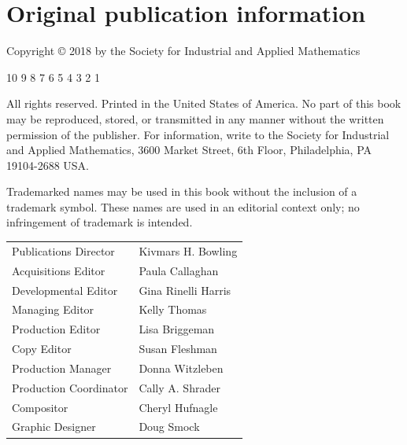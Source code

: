 \section*{{Original publication information}}
{Copyright © 2018 by the Society for Industrial and Applied Mathematics}

10 9 8 7 6 5 4 3 2 1

{All rights reserved. Printed in the United States of America. No part of this book may be reproduced, stored, or transmitted in any manner without the written permission of the publisher. For information, write to the Society for Industrial and Applied Mathematics, 3600 Market Street, 6th Floor, Philadelphia, PA 19104-2688 USA.}

{Trademarked names may be used in this book without the inclusion of a trademark symbol. These names are used in an editorial context only; no infringement of trademark is intended.}

\begin{center}\begin{tabular}{ll}
{Publications Director}&Kivmars H. Bowling\\
{Acquisitions Editor}&Paula Callaghan\\
{Developmental Editor}&Gina Rinelli Harris\\
{Managing Editor}&Kelly Thomas\\
{Production Editor}&Lisa Briggeman\\
{Copy Editor}&Susan Fleshman\\
{Production Manager}&Donna Witzleben\\
{Production Coordinator}&Cally A. Shrader\\
{Compositor}&Cheryl Hufnagle\\
{Graphic Designer}&Doug Smock
\end{tabular}\end{center}

